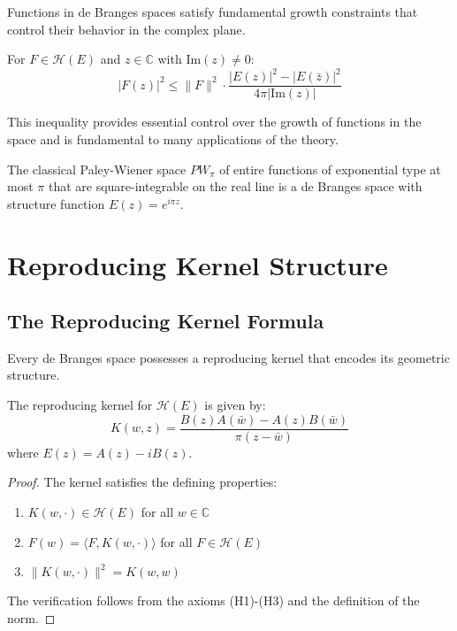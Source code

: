 Functions in de Branges spaces satisfy fundamental growth constraints that control their behavior in the complex plane.

\begin{theorem}
\label{thm:fundamental-inequality}
For $F \in \mathcal{H}(E)$ and $z \in \mathbb{C}$ with $\text{Im}(z) \neq 0$:
$$|F(z)|^2 \leq \|F\|^2 \cdot \frac{|E(z)|^2 - |E(\bar{z})|^2}{4\pi |\text{Im}(z)|}$$
\end{theorem}

This inequality provides essential control over the growth of functions in the space and is fundamental to many applications of the theory.

\begin{example}
The classical Paley-Wiener space $PW_\pi$ of entire functions of exponential type at most $\pi$ that are square-integrable on the real line is a de Branges space with structure function $E(z) = e^{i\pi z}$.
\end{example}

\section{Reproducing Kernel Structure}
\label{sec:reproducing-kernel}

\subsection{The Reproducing Kernel Formula}

Every de Branges space possesses a reproducing kernel that encodes its geometric structure.

\begin{theorem}
\label{thm:reproducing-kernel}
The reproducing kernel for $\mathcal{H}(E)$ is given by:
$$K(w,z) = \frac{B(z)A(\bar{w}) - A(z)B(\bar{w})}{\pi(z-\bar{w})}$$
where $E(z) = A(z) - iB(z)$.
\end{theorem}

\begin{proof}
The kernel satisfies the defining properties:
\begin{enumerate}
\item $K(w,\cdot) \in \mathcal{H}(E)$ for all $w \in \mathbb{C}$
\item $F(w) = \langle F, K(w,\cdot) \rangle$ for all $F \in \mathcal{H}(E)$
\item $\|K(w,\cdot)\|^2 = K(w,w)$
\end{enumerate}
The verification follows from the axioms (H1)-(H3) and the definition of the norm.
\end{proof}

